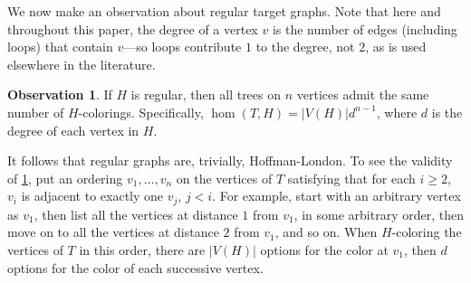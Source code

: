 \documentclass[11pt]{article}
\theoremstyle{definition}
\newtheorem{observation}[theorem]{Observation}
\begin{document}
We now make an observation about regular target graphs. Note that here and throughout this paper, the degree of a vertex $v$ is the number of edges (including loops) that contain $v$---so loops contribute $1$ to the degree, not $2$, as is used elsewhere in the literature. 

\begin{observation} \label{obs:regular}
If $H$ is regular, then all trees on $n$ vertices admit the same number of $H$-colorings. Specifically, $\hom(T,H) = |V(H)|d^{n-1}$, where $d$ is the degree of each vertex in $H$.
\end{observation}

It follows that regular graphs are, trivially, Hoffman-London. To see the validity of \cref{obs:regular}, put an ordering $v_1, \ldots, v_n$ on the vertices of $T$ satisfying that for each $i \ge 2$, $v_i$ is adjacent to exactly one $v_j$, $j < i$. For example, start with an arbitrary vertex as $v_1$, then list all the vertices at distance $1$ from $v_1$, in some arbitrary order, then move on to all the vertices at distance $2$ from $v_1$, and so on. When $H$-coloring the vertices of $T$ in this order, there are $|V(H)|$ options for the color at $v_1$, then $d$ options for the color of each successive vertex. 
\end{document}
